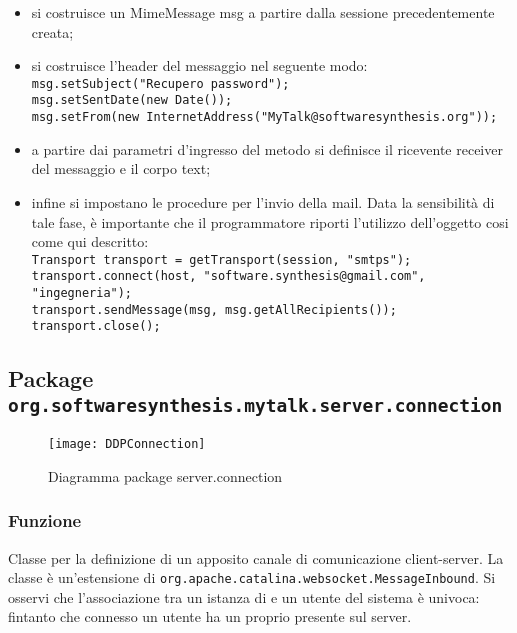 \begin{description}
\begin{itemize}
	\item si costruisce un MimeMessage msg a partire dalla sessione precedentemente creata;
	\item si costruisce l'header del messaggio nel seguente modo:\\
	
		\verb|msg.setSubject("Recupero password");|\\
	    \verb|msg.setSentDate(new Date());|\\
	    \verb|msg.setFrom(new InternetAddress("MyTalk@softwaresynthesis.org"));|\\
	\item a partire dai parametri d'ingresso del metodo si definisce il ricevente receiver del messaggio e il corpo text;
	\item infine si impostano le procedure per l'invio della mail. Data la sensibilità di tale fase, è importante che il programmatore riporti l'utilizzo dell'oggetto  cosi come qui descritto:\\
	
		\verb|Transport transport = getTransport(session, "smtps");|\\
		\verb|transport.connect(host, "software.synthesis@gmail.com", "ingegneria");|\\
		\verb|transport.sendMessage(msg, msg.getAllRecipients());|\\
		\verb|transport.close();|
\end{itemize}

\end{description}

\subsection{Package \texttt{org.softwaresynthesis.mytalk.server.connection}}\label{sec:connection}

\begin{center}
\begin{figure}[H]
  \texttt{[image: DDPConnection]}
\caption{Diagramma package server.connection}
\end{figure}
\end{center}


\subsubsection*{Funzione}
Classe per la definizione di un apposito canale di comunicazione client-server. La classe è un'estensione di \texttt{org.apache.catalina.websocket.MessageInbound}. Si osservi che l'associazione tra un istanza di  e un utente del sistema è univoca: fintanto che connesso un utente ha un proprio  presente sul server.

